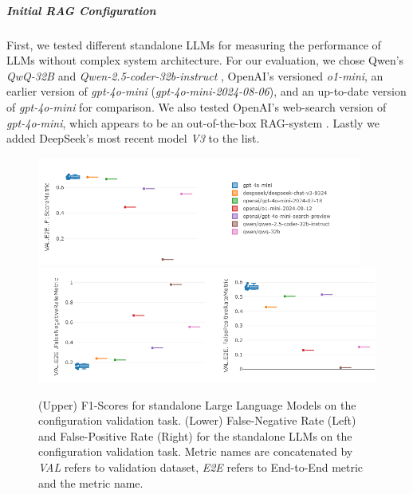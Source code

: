 \subparagraph{Initial RAG Configuration} 
First, we tested different standalone LLMs for measuring the performance of LLMs without complex system architecture. For our evaluation, we chose Qwen's \textit{QwQ-32B} \cite{qwq32b} and \textit{Qwen-2.5-coder-32b-instruct} \cite{hui2024qwen2}\cite{qwen2}\cite{qwen2.5}, OpenAI's versioned \textit{o1-mini}, an earlier version of \textit{gpt-4o-mini} (\textit{gpt-4o-mini-2024-08-06}), and an up-to-date version of \textit{gpt-4o-mini} for comparison. We also tested OpenAI's web-search version of \textit{gpt-4o-mini}, which appears to be an out-of-the-box RAG-system \cite{OpenAI_2022}. Lastly we added DeepSeek's most recent model \textit{V3} \cite{deepseekai2024deepseekv3technicalreport} to the list. 

\begin{figure}[!ht]
    \centering
    \includegraphics[width=0.95\textwidth]{images/LLMStandalone-by-model.png}\\[6pt]
    \includegraphics[width=\textwidth]{images/LLMStandalone-by-model-FNRFPR.png}
    \caption{(Upper) F1-Scores for standalone Large Language Models on the configuration validation task. (Lower) False-Negative Rate (Left) and False-Positive Rate (Right) for the standalone LLMs on the configuration validation task. Metric names are concatenated by \textit{VAL} refers to validation dataset, \textit{E2E} refers to End-to-End metric and the metric name.}
    \label{fig:LLMStandalone-Results}
  \end{figure}

